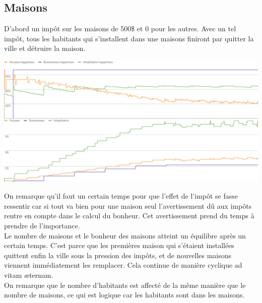 \documentclass[11pt]{report}
\begin{document}
\subsection{Maisons}
D'abord un impôt sur les maisons de 500\$ et 0 pour les autres. Avec un tel impôt, tous les habitants qui s'installent dans une maisons finiront par quitter la ville et détruire la maison.
\begin{center}
	\includegraphics[width=\textwidth]{houses_taxes}
\end{center}
On remarque qu'il faut un certain temps pour que l'effet de l'impôt se fasse ressentir car si tout va bien pour une maison seul l'avertissement dû aux impôts rentre en compte dans le calcul du bonheur. Cet avertissement prend du temps à prendre de l'importance.\\
Le nombre de maisons et le bonheur des maisons atteint un équilibre après un certain temps. C'est parce que les premières maison qui s'étaient installées quittent enfin la ville sous la pression des impôts, et de nouvelles maisons viennent immédiatement les remplacer. Cela continue de manière cyclique ad vitam æternam.\\
On remarque que le nombre d'habitants est affecté de la même manière que le nombre de maisons, ce qui est logique car les habitants sont dans les maisons.

\newpage
\end{document}
